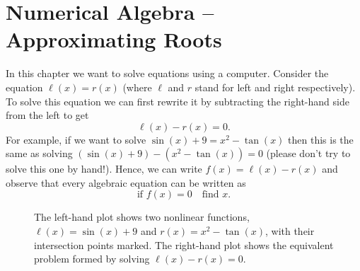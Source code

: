 \chapter{Numerical Algebra -- Approximating Roots}
In this chapter we want to solve equations using a computer.  Consider the equation
$\ell(x) = r(x)$ (where $\ell$ and $r$ stand for left and right respectively).  To solve
this equation we can first rewrite it by subtracting the right-hand side from the left to
get
\[ \ell(x) - r(x) = 0. \]
For example, if we want to solve $\sin(x) + 9 = x^2 - \tan(x)$ then this is the same as
solving $(\sin(x) + 9 ) - (x^2 - \tan(x)) = 0$ (please don't try to solve this one by
hand!).  Hence, we can write $f(x)=\ell(x)-r(x)$
and observe that every algebraic equation can be written as
\[ \text{if } f(x) = 0 \quad \text{find } x. \]

\begin{figure}[ht!]
    \begin{center}
    \end{center}
    \caption{The left-hand plot shows two nonlinear functions, $\ell(x) = \sin(x) + 9$ and
        $r(x) = x^2 - \tan(x)$, with their intersection points marked. The right-hand plot
    shows the equivalent problem formed by solving $\ell(x) - r(x) = 0$.}
    \label{fig:initial_root_example}
\end{figure}

